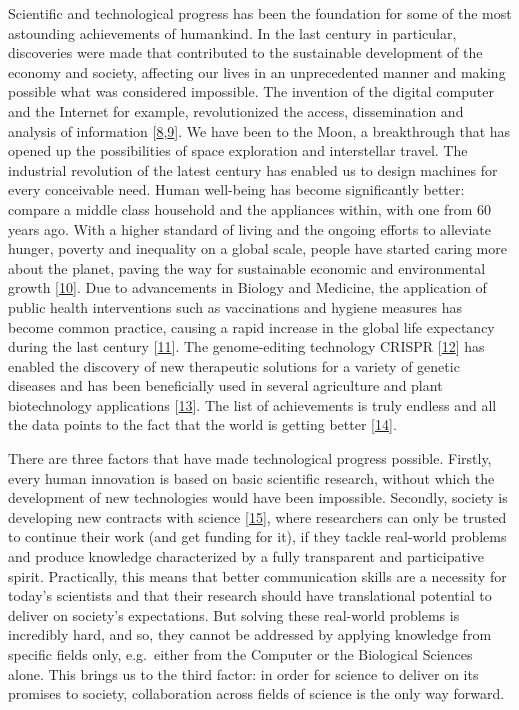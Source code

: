\documentclass[
  12pt,
]{book}
\begin{document}
Scientific and technological progress has been the foundation for some of the most astounding achievements of humankind.
In the last century in particular, discoveries were made that contributed to the sustainable development of the economy and society, affecting our lives in an unprecedented manner and making possible what was considered impossible.
The invention of the digital computer and the Internet for example, revolutionized the access, dissemination and analysis of information {[}\protect\hyperlink{ref-Abbate2000}{8},\protect\hyperlink{ref-Naughton2016}{9}{]}.
We have been to the Moon, a breakthrough that has opened up the possibilities of space exploration and interstellar travel.
The industrial revolution of the latest century has enabled us to design machines for every conceivable need.
Human well-being has become significantly better: compare a middle class household and the appliances within, with one from 60 years ago.
With a higher standard of living and the ongoing efforts to alleviate hunger, poverty and inequality on a global scale, people have started caring more about the planet, paving the way for sustainable economic and environmental growth {[}\protect\hyperlink{ref-Polasky2019}{10}{]}.
Due to advancements in Biology and Medicine, the application of public health interventions such as vaccinations and hygiene measures has become common practice, causing a rapid increase in the global life expectancy during the last century {[}\protect\hyperlink{ref-Roser2013}{11}{]}.
The genome-editing technology CRISPR {[}\protect\hyperlink{ref-Jinek2012}{12}{]} has enabled the discovery of new therapeutic solutions for a variety of genetic diseases and has been beneficially used in several agriculture and plant biotechnology applications {[}\protect\hyperlink{ref-Zhu2020}{13}{]}.
The list of achievements is truly endless and all the data points to the fact that the world is getting better {[}\protect\hyperlink{ref-Bailey2020}{14}{]}.

There are three factors that have made technological progress possible.
Firstly, every human innovation is based on basic scientific research, without which the development of new technologies would have been impossible.
Secondly, society is developing new contracts with science {[}\protect\hyperlink{ref-Gibbons1999}{15}{]}, where researchers can only be trusted to continue their work (and get funding for it), if they tackle real-world problems and produce knowledge characterized by a fully transparent and participative spirit.
Practically, this means that better communication skills are a necessity for today's scientists and that their research should have translational potential to deliver on society's expectations.
But solving these real-world problems is incredibly hard, and so, they cannot be addressed by applying knowledge from specific fields only, e.g.~either from the Computer or the Biological Sciences alone.
This brings us to the third factor: in order for science to deliver on its promises to society, collaboration across fields of science is the only way forward.
\end{document}
